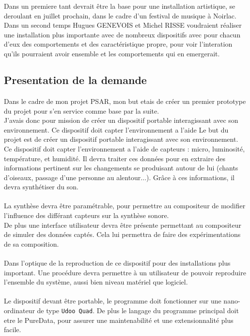 \documentclass[a4paper, titlepage, oneside, 12pt]{article}%
\begin{document}
Dans un premiere tant devrait être la base pour une installation artistique, se deroulant en juillet prochain, dans le cadre d'un festival de musique à Noirlac. Dans un second temps Hugues GENEVOIS et Michel RISSE voudraient réaliser une installation plus importante avec de nombreux dispositifs avec pour chacun d'eux des comportements et des caractéristique propre, pour voir l'interation qu'ils pourraient avoir ensemble et les comportements qui en emergerait.

\subsection{Presentation de la demande}
\paragraph{}
Dans le cadre de mon projet PSAR, mon but etais de créer un premier prototype du projet pour s'en service comme base par la suite.\\
J'avais donc pour mission de créer un dispositif portable interagissant avec son environnement. Ce dispositif doit capter l'environnement a l'aide
Le but du projet est de créer un dispositif portable interagissant avec son environnement. Ce dispositif doit capter l'environnement a l'aide de capteurs : micro, luminosité, température, et humidité. Il devra traiter ces données pour en extraire des informations pertinent sur les changements se produisant autour de lui (chants d'oiseaux, passage d'une personne au alentour...). Grâce à ces informations, il devra synthétiser du son.
\paragraph{}
La synthèse devra être paramétrable, pour permettre au compositeur de modifier
l’influence des différant capteurs sur la synthèse sonore.\\
De plus une interface utilisateur devra être présente permettant au compositeur de simuler des données
captés. Cela lui permettra de faire des expérimentations de sa composition.
\paragraph{}
Dans l’optique de la reproduction de ce dispositif pour des installations plus important. Une procédure devra permettre à un utilisateur de pouvoir reproduire l’ensemble du système, aussi bien niveau matériel que logiciel.
\paragraph{}
Le dispositif devant être portable, le programme doit fonctionner sur une nano-
ordinateur de type \texttt{Udoo Quad}. De plus le langage du programme principal doit etre le 
PureData, pour assurer une maintenabilité et une extensionnalité plus facile.
\end{document}
